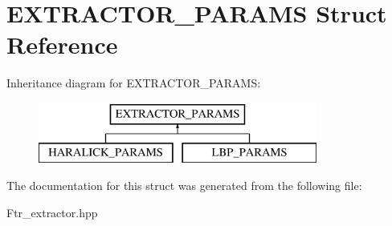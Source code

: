 \hypertarget{struct_e_x_t_r_a_c_t_o_r___p_a_r_a_m_s}{\section{E\+X\+T\+R\+A\+C\+T\+O\+R\+\_\+\+P\+A\+R\+A\+M\+S Struct Reference}
\label{struct_e_x_t_r_a_c_t_o_r___p_a_r_a_m_s}
}
Inheritance diagram for E\+X\+T\+R\+A\+C\+T\+O\+R\+\_\+\+P\+A\+R\+A\+M\+S\+:\begin{figure}[H]
\begin{center}
\leavevmode
\includegraphics[height=2.000000cm]{struct_e_x_t_r_a_c_t_o_r___p_a_r_a_m_s}
\end{center}
\end{figure}


The documentation for this struct was generated from the following file\+:\begin{DoxyCompactItemize}
\item 
Ftr\+\_\+extractor.\+hpp\end{DoxyCompactItemize}

